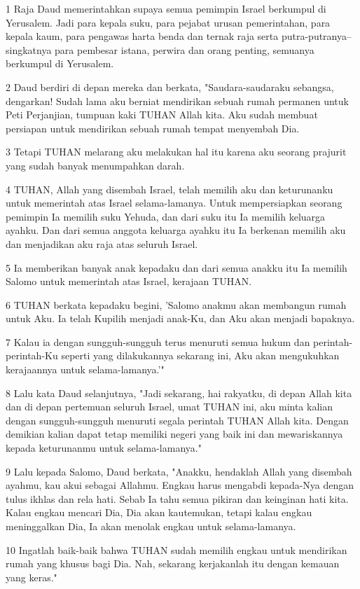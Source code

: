 \par 1 Raja Daud memerintahkan supaya semua pemimpin Israel berkumpul di Yerusalem. Jadi para kepala suku, para pejabat urusan pemerintahan, para kepala kaum, para pengawas harta benda dan ternak raja serta putra-putranya--singkatnya para pembesar istana, perwira dan orang penting, semuanya berkumpul di Yerusalem.
\par 2 Daud berdiri di depan mereka dan berkata, "Saudara-saudaraku sebangsa, dengarkan! Sudah lama aku berniat mendirikan sebuah rumah permanen untuk Peti Perjanjian, tumpuan kaki TUHAN Allah kita. Aku sudah membuat persiapan untuk mendirikan sebuah rumah tempat menyembah Dia.
\par 3 Tetapi TUHAN melarang aku melakukan hal itu karena aku seorang prajurit yang sudah banyak menumpahkan darah.
\par 4 TUHAN, Allah yang disembah Israel, telah memilih aku dan keturunanku untuk memerintah atas Israel selama-lamanya. Untuk mempersiapkan seorang pemimpin Ia memilih suku Yehuda, dan dari suku itu Ia memilih keluarga ayahku. Dan dari semua anggota keluarga ayahku itu Ia berkenan memilih aku dan menjadikan aku raja atas seluruh Israel.
\par 5 Ia memberikan banyak anak kepadaku dan dari semua anakku itu Ia memilih Salomo untuk memerintah atas Israel, kerajaan TUHAN.
\par 6 TUHAN berkata kepadaku begini, 'Salomo anakmu akan membangun rumah untuk Aku. Ia telah Kupilih menjadi anak-Ku, dan Aku akan menjadi bapaknya.
\par 7 Kalau ia dengan sungguh-sungguh terus menuruti semua hukum dan perintah-perintah-Ku seperti yang dilakukannya sekarang ini, Aku akan mengukuhkan kerajaannya untuk selama-lamanya.'"
\par 8 Lalu kata Daud selanjutnya, "Jadi sekarang, hai rakyatku, di depan Allah kita dan di depan pertemuan seluruh Israel, umat TUHAN ini, aku minta kalian dengan sungguh-sungguh menuruti segala perintah TUHAN Allah kita. Dengan demikian kalian dapat tetap memiliki negeri yang baik ini dan mewariskannya kepada keturunanmu untuk selama-lamanya."
\par 9 Lalu kepada Salomo, Daud berkata, "Anakku, hendaklah Allah yang disembah ayahmu, kau akui sebagai Allahmu. Engkau harus mengabdi kepada-Nya dengan tulus ikhlas dan rela hati. Sebab Ia tahu semua pikiran dan keinginan hati kita. Kalau engkau mencari Dia, Dia akan kautemukan, tetapi kalau engkau meninggalkan Dia, Ia akan menolak engkau untuk selama-lamanya.
\par 10 Ingatlah baik-baik bahwa TUHAN sudah memilih engkau untuk mendirikan rumah yang khusus bagi Dia. Nah, sekarang kerjakanlah itu dengan kemauan yang keras."

